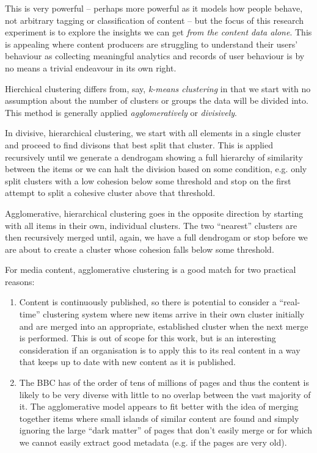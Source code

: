 This is very powerful -- perhaps more powerful as it models how
people behave, not arbitrary tagging or classification of content --
but the focus of this research experiment is to explore the insights
we can get \emph{from the content data alone}. This is appealing
where content producers are struggling to understand their users'
behaviour as collecting meaningful analytics and records of user
behaviour is by no means a trivial endeavour in its own right.

Hierchical clustering differs from, say,
\emph{k-means clustering}\cite{witten2005data} in that
we start with no assumption about the number of clusters or groups
the data will be divided into. This method is generally applied
\emph{agglomeratively} or \emph{divisively}.

In divisive, hierarchical clustering, we start with all elements in
a single cluster and proceed to find divisons that best split that
cluster. This is applied recursively until we generate a
dendrogam\cite{witten2005data} showing a full hierarchy of similarity
between the items or we can halt the division based on some condition,
e.g. only split clusters with a low cohesion below some threshold
and stop on the first attempt to split a cohesive cluster above
that threshold.

Agglomerative, hierarchical clustering goes in the opposite direction
by starting with all items in their own, individual clusters.
The two ``nearest'' clusters are then recursively merged until, again,
we have a full dendrogam or stop before we are about to create a
cluster whose cohesion falls below some threshold.

For media content, agglomerative clustering is a good match for two
practical reasons:

\begin{enumerate}
\item Content is continuously published, so there is potential
  to consider a ``real-time'' clustering system where new items
  arrive in their own cluster initially and are merged into an
  appropriate, established cluster when the next merge is performed.
  This is out of scope for this work, but is an interesting
  consideration if an organisation is to apply this to its real
  content in a way that keeps up to date with new content as it is
  published.
\item The BBC has of the order of tens of millions of pages and thus
  the content is likely to be very diverse with little to no overlap
  between the vast majority of it. The agglomerative model appears to
  fit better with the idea of merging together items where small
  islands of similar content are found and simply ignoring the large
  ``dark matter'' of pages that don't easily merge or for which we
  cannot easily extract good metadata (e.g. if the pages are very
  old).
\end{enumerate}


